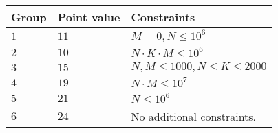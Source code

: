 \noindent
\begin{tabular}{| l | l | p{12cm} |}
  \hline
  \textbf{Group} & \textbf{Point value} & \textbf{Constraints} \\ \hline
  $1$    & $11$      &  $M = 0, N \leq 10^6$ \\ \hline
  $2$    & $10$      &  $N \cdot K \cdot M \leq 10^6$ \\ \hline
  $3$    & $15$      &  $N, M \leq 1000, N \leq K \leq 2000$ \\ \hline
  $4$    & $19$      &  $N \cdot M \leq 10^7$ \\ \hline
  $5$    & $21$      &  $N \leq 10^6 $ \\ \hline
  $6$    & $24$      &  No additional constraints. \\ \hline
\end{tabular}

